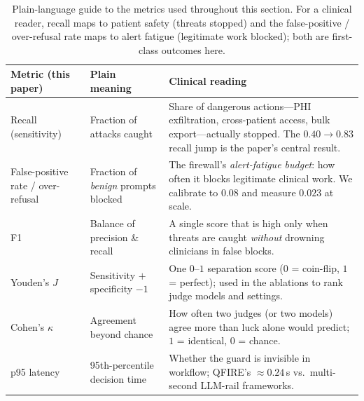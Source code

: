 \documentclass[11pt]{article}
\newcommand{\rev}[1]{#1}
\begin{document}
\begin{table}[t]\centering\small
\begin{tabular}{L{2.7cm}L{3.0cm}L{6.6cm}}
\toprule
Metric (this paper) & Plain meaning & Clinical reading \\
\midrule
Recall (sensitivity) & Fraction of attacks caught & Share of dangerous actions---PHI exfiltration, cross-patient access, bulk export---actually stopped. The $0.40\rightarrow0.83$ recall jump is the paper's central result. \\
False-positive rate / over-refusal & Fraction of \emph{benign} prompts blocked & The firewall's \emph{alert-fatigue budget}: how often it blocks legitimate clinical work. We calibrate to $0.08$ and measure $0.023$ at scale. \\
F1 & Balance of precision \& recall & A single score that is high only when threats are caught \emph{without} drowning clinicians in false blocks. \\
Youden's $J$ & Sensitivity $+$ specificity $-1$ & One $0$--$1$ separation score ($0$ = coin-flip, $1$ = perfect); used in the ablations to rank judge models and settings. \\
Cohen's $\kappa$ & Agreement beyond chance & How often two judges (or two models) agree more than luck alone would predict; $1$ = identical, $0$ = chance. \\
p95 latency & 95th-percentile decision time & Whether the guard is invisible in workflow; QFIRE's ${\approx}0.24$\,s vs.\ multi-second LLM-rail frameworks. \\
\bottomrule
\end{tabular}
\caption{\rev{Plain-language guide to the metrics used throughout this section.
For a clinical reader, recall maps to patient safety (threats stopped) and the
false-positive / over-refusal rate maps to alert fatigue (legitimate work
blocked); both are first-class outcomes here.}}
\label{tab:plainmetrics}
\end{table}
\end{document}
